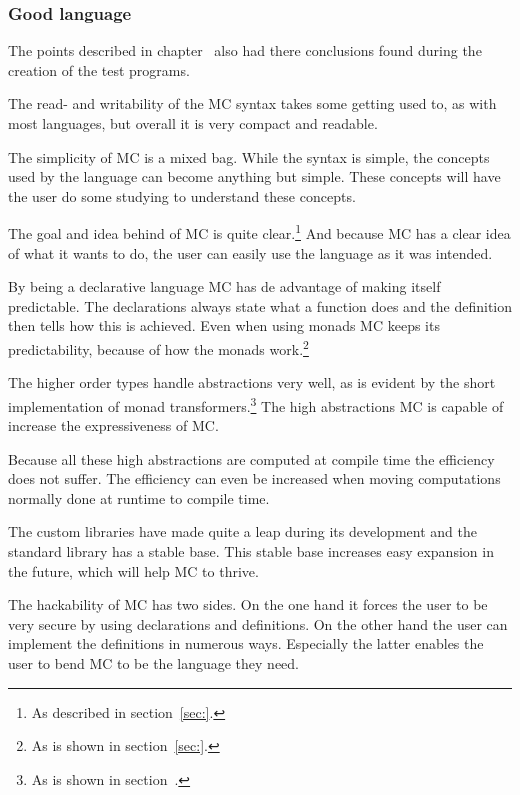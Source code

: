 \subsubsection{Good language}
The points described in chapter~\cite{chap:criteria} also had there conclusions found during the creation of the test programs.


The read- and writability of the MC syntax takes some getting used to, as with most languages, but overall it is very compact and readable.

The simplicity of MC is a mixed bag.
While the syntax is simple, the concepts used by the language can become anything but simple.
These concepts will have the user do some studying to understand these concepts.

The goal and idea behind of MC is quite clear.\footnote{As described in section~\ref{sec:}.}
And because MC has a clear idea of what it wants to do, the user can easily use the language as it was intended.

By being a declarative language MC has de advantage of making itself predictable.
The declarations always state what a function does and the definition then tells how this is achieved.
Even when using monads MC keeps its predictability, because of how the monads work.\footnote{As is shown in section~\ref{sec:}.}

The higher order types handle abstractions very well, as is evident by the short implementation of monad transformers.\footnote{As is shown in section~\cite{sec:}.}
The high abstractions MC is capable of increase the expressiveness of MC.

Because all these high abstractions are computed at compile time the efficiency does not suffer.
The efficiency can even be increased when moving computations normally done at runtime to compile time.

The custom libraries have made quite a leap during its development and the standard library has a stable base.
This stable base increases easy expansion in the future, which will help MC to thrive.

The hackability of MC has two sides.
On the one hand it forces the user to be very secure by using declarations and definitions.
On the other hand the user can implement the definitions in numerous ways.
Especially the latter enables the user to bend MC to be the language they need.

